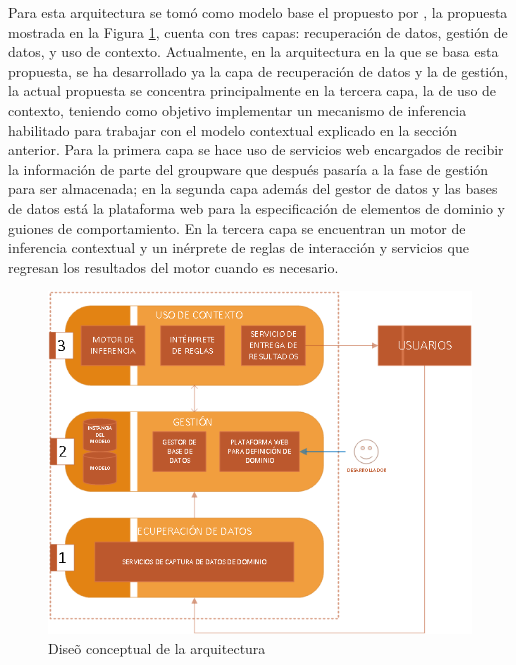 Para esta arquitectura se tom\'o como modelo base el propuesto por \cite{montane2013context}, la propuesta mostrada en la Figura \ref{ARCH:propuesta}, cuenta con tres capas: recuperaci\'on de datos, gesti\'on de datos, y uso de contexto. Actualmente, en la arquitectura en la que se basa esta propuesta, se ha desarrollado ya la capa de recuperaci\'on de datos y la de gesti\'on, la actual propuesta se concentra principalmente en la tercera capa, la de uso de contexto, teniendo como objetivo implementar un mecanismo de inferencia habilitado para trabajar con el modelo contextual explicado en la secci\'on anterior. Para la primera capa se hace uso de servicios web encargados de recibir la informaci\'on de parte del groupware que despu\'es pasar\'ia a la fase de gesti\'on para ser almacenada; en la segunda capa adem\'as del gestor de datos y las bases de datos est\'a la plataforma web para la especificaci\'on de elementos de dominio y guiones de comportamiento. En la tercera capa se encuentran un motor de inferencia contextual y un in\'erprete de reglas de interacci\'on y servicios que regresan los resultados del motor cuando es necesario.

\newpage

\begin{figure}[h!]
\centering
\includegraphics[scale=0.70]{images/arquitecturav2}
\caption{Dise\~o conceptual de la arquitectura}
\label{ARCH:propuesta}
\end{figure}

